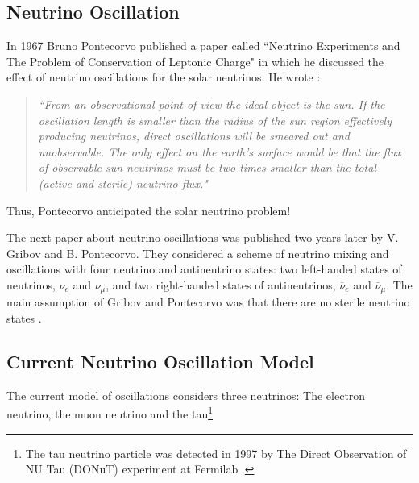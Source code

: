 \subsection{Neutrino Oscillation}

In 1967 Bruno Pontecorvo published a paper called ``Neutrino Experiments and The Problem of Conservation of Leptonic Charge" in which he discussed the effect of neutrino oscillations for the solar neutrinos. He wrote \cite{pontecorvo_1967}: 
\begin{quote}
\emph{``From an observational point of view the ideal object is the sun. If the oscillation length is smaller than the radius of the sun region effectively producing neutrinos, direct oscillations will be smeared out and unobservable. The only effect on the earth’s surface would be that the flux of observable sun neutrinos must be two times smaller than the total (active and sterile) neutrino flux."}
\end{quote}
%
Thus, Pontecorvo anticipated the solar neutrino problem! 

The next paper about neutrino oscillations was published two years later by V. Gribov and B. Pontecorvo. They considered a scheme of neutrino mixing and oscillations with four neutrino and antineutrino states: two left-handed states of neutrinos, $\nu_e$ and $\nu_\mu$, and two right-handed states of antineutrinos,  $\overline{\nu}_e$ and $\overline{\nu}_\mu$. The main assumption of Gribov and Pontecorvo was that there are no sterile neutrino states \cite{neutrino_oscillations_brief_history_and_present_status}.

\subsection{Current Neutrino Oscillation Model}

The current model of oscillations considers three neutrinos: The electron neutrino, the muon neutrino and the tau\footnote{The tau neutrino particle was detected in 1997 by The Direct Observation of NU Tau (DONuT) experiment at Fermilab \cite{tau_neutrino_discovery}.} 

